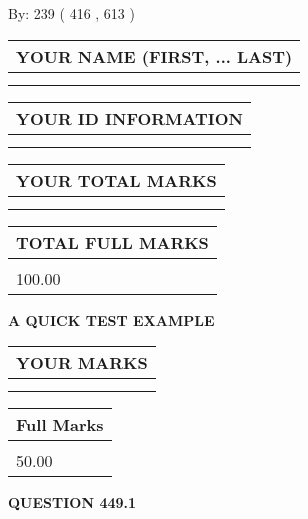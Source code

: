 \documentclass[12pt]{article}
\begin{document}
   
\hspace{1.0in} By: 
 239 ( 416 ,  613 )
   
   
   
   
\newpage 
\setcounter{page}{ 
   449001 } 
   
   
   
   
\noindent\begin{tabular}{|l|}
\hline
YOUR NAME (FIRST, ... LAST)  \\
\hline
 \\ 
 \\ 
\hline
\end{tabular}
\hspace{0.05in} \begin{tabular}{|l|}
\hline
 YOUR   ID   INFORMATION  \\
\hline
 \\ 
 \\ 
\hline
\end{tabular}
   
   
\vspace{0.2in}\noindent\begin{tabular}{|l|}
\hline
YOUR TOTAL MARKS  \\
\hline
 \\ 
 \\ 
\hline
\end{tabular}
\hspace{0.05in} \begin{tabular}{|l|}
\hline
TOTAL FULL MARKS  \\
\hline
 \\ 
100.00 \\
\hline
\end{tabular}
   
   
 \vspace{0.2in}
{\LARGE {\textbf{ A QUICK TEST EXAMPLE}}}
   
   
  
\vspace{0.2in}
  
\noindent\begin{tabular}{|l|}
\hline
 YOUR MARKS  \\
\hline
 \\ 
 \\ 
\hline
\end{tabular}
\hspace{0.05in} \begin{tabular}{|l|}
\hline
 Full Marks  \\
\hline
 \\ 
50.00 \\
\hline
\end{tabular}
{\textbf{\Large{QUESTION
449.1 
}}}
  
\end{document}
